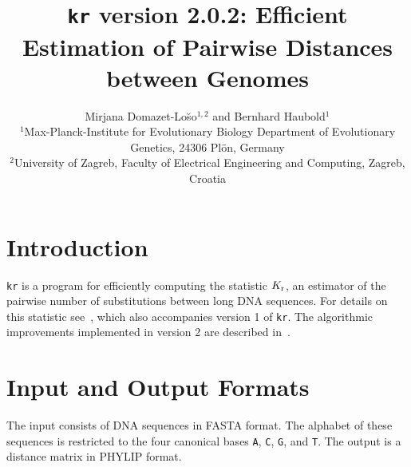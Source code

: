\documentclass{article}
\newcommand{\ty}{\texttt}
\newcommand{\kr}{K_{\rm r}}
\newcommand{\version}{2.0.2}
\begin{document}
\title{\ty{kr} version \version: Efficient Estimation of Pairwise
  Distances between Genomes}
\author{Mirjana Domazet-Lo\u{s}o$^{1,2}$ and Bernhard Haubold$^1$\\
\small
$^{1}$Max-Planck-Institute for Evolutionary Biology
  Department of Evolutionary Genetics, 24306 Pl\"on, Germany\\
\small
$^{2}$University of Zagreb, Faculty of Electrical Engineering and
  Computing, Zagreb, Croatia}                                   
\maketitle

\section{Introduction}
\ty{kr} is a program for efficiently computing the statistic $\kr$, an
estimator of the pairwise number of
substitutions between long DNA sequences. For details on this statistic see~\cite{hau09:est},
which also accompanies version 1 of \ty{kr}. The algorithmic
improvements implemented in version 2 are described
in~\cite{dom09:eff}. 

\section{Input and Output Formats}
The input consists of DNA sequences in FASTA format. The alphabet of
these sequences is restricted to the four canonical bases \ty{A},
\ty{C}, \ty{G}, and \ty{T}. The output is a
distance matrix in PHYLIP format.
\end{document}
